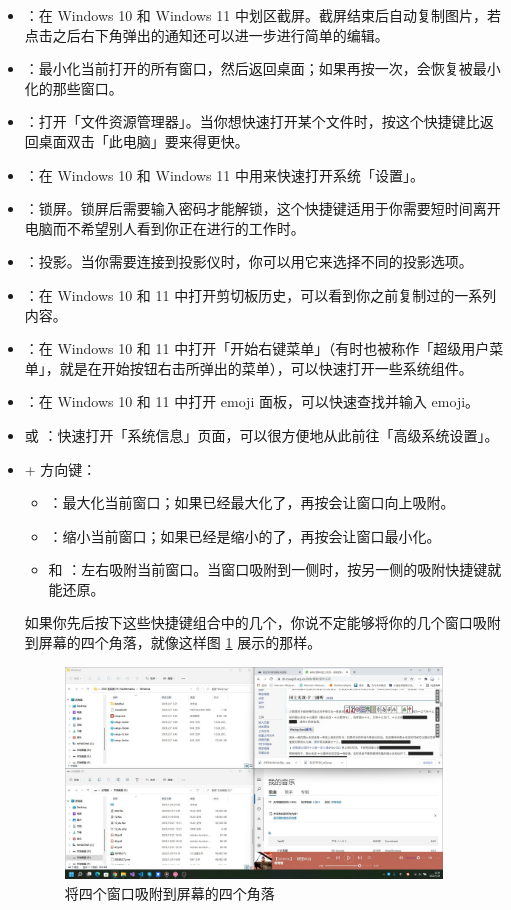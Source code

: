 \begin{itemize}
  \item {}：在 Windows 10 和 Windows 11 中划区截屏。截屏结束后自动复制图片，若点击之后右下角弹出的通知还可以进一步进行简单的编辑。
  \item {}：最小化当前打开的所有窗口，然后返回桌面；如果再按一次，会恢复被最小化的那些窗口。
  \item {}：打开「文件资源管理器」。当你想快速打开某个文件时，按这个快捷键比返回桌面双击「此电脑」要来得更快。
  \item {}：在 Windows 10 和 Windows 11 中用来快速打开系统「设置」。
  \item {}：锁屏。锁屏后需要输入密码才能解锁，这个快捷键适用于你需要短时间离开电脑而不希望别人看到你正在进行的工作时。
  \item {}：投影。当你需要连接到投影仪时，你可以用它来选择不同的投影选项。
  \item {}：在 Windows 10 和 11 中打开剪切板历史，可以看到你之前复制过的一系列内容。
  \item {}：在 Windows 10 和 11 中打开「开始右键菜单」（有时也被称作「超级用户菜单」，就是在开始按钮右击所弹出的菜单），可以快速打开一些系统组件。
  \item {}：在 Windows 10 和 11 中打开 emoji 面板，可以快速查找并输入 emoji。
  \item {} 或 ：快速打开「系统信息」页面，可以很方便地从此前往「高级系统设置」。
  \item {} + 方向键：
  \begin{itemize}
    \item {}：最大化当前窗口；如果已经最大化了，再按会让窗口向上吸附。
    \item {}：缩小当前窗口；如果已经是缩小的了，再按会让窗口最小化。
    \item {} 和 ：左右吸附当前窗口。当窗口吸附到一侧时，按另一侧的吸附快捷键就能还原。
  \end{itemize}

  如果你先后按下这些快捷键组合中的几个，你说不定能够将你的几个窗口吸附到屏幕的四个角落，就像这样图 \ref{Four_windows} 展示的那样。

  \begin{figure}[htb!]
    \centering
    \includegraphics[width=10cm]{assets/Four_windows.jpg}
    \caption{将四个窗口吸附到屏幕的四个角落}
    \label{Four_windows}
  \end{figure}


\end{itemize}

